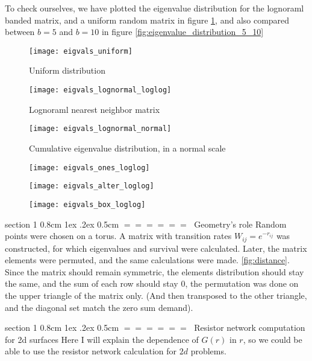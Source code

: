 \documentclass[onecolumn,fleqn,notitlepage,secnumarabic]{revtex4}
\makeatletter
\def\section{%
  \@startsection
    {section}%
    {1}%
    {\z@}%
    {0.8cm \@plus1ex \@minus .2ex}%
    {0.5cm}%
    {\Large\bf $=\!=\!=\!=\!=\!=\;$}%
}%
\makeatother
\begin{document}
To check ourselves, we have plotted the eigenvalue distribution for the lognoraml banded matrix, and a uniform random matrix in figure \ref{fig:eigenvalue_distribution}, and also compared between $b=5$ and $b=10$ in figure \ref{fig:eigenvalue_distribution_5_10}
\begin{figure}[H]
    {\texttt{[image: eigvals\_uniform]}}
\caption{Uniform distribution}
    \label{fig:eigenvalue_distribution}
\end{figure}
\begin{figure}[H]
    {\texttt{[image: eigvals\_lognormal\_loglog]}}
    \caption{Lognoraml nearest neighbor matrix}

\end{figure}
\begin{figure}[H]
    \texttt{[image: eigvals\_lognormal\_normal]}
    \caption{Cumulative eigenvalue distribution, in a normal scale}
\end{figure}
\begin{figure}[H]
    \texttt{[image: eigvals\_ones\_loglog]}
\end{figure}
\begin{figure}[H]
    \texttt{[image: eigvals\_alter\_loglog]}
\end{figure}
\begin{figure}[H]
    \texttt{[image: eigvals\_box\_loglog]}
\end{figure}

\section{Geometry's role} \label{sec:geometry}
Random points were chosen on a torus. A matrix with transition rates $W_{ij} = e^{-r_{ij}}$ was constructed, for which eigenvalues and survival were calculated. Later, the matrix elements were permuted, and the same calculations were made. \ref{fig:distance}. Since the matrix should remain symmetric, the elements distribution should stay the same, and the sum of each row should stay $0$, the permutation was done on the upper triangle of the matrix only. (And then transposed to the other triangle, and the diagonal set match the zero sum demand).

\section{Resistor network computation for 2d surfaces}
Here I will explain the dependence of $G(r)$ in $r$, so we could be able to use the resistor network calculation for $2d$ problems.
\end{document}
